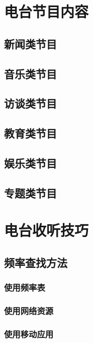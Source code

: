 \documentclass[12pt,UTF8]{ctexbook}
\begin{document}
\chapter{电台节目内容}

\section{新闻类节目}

\section{音乐类节目}

\section{访谈类节目}

\section{教育类节目}

\section{娱乐类节目}

\section{专题类节目}

\chapter{电台收听技巧}

\section{频率查找方法}

\subsection{使用频率表}

\subsection{使用网络资源}

\subsection{使用移动应用}
\end{document}
